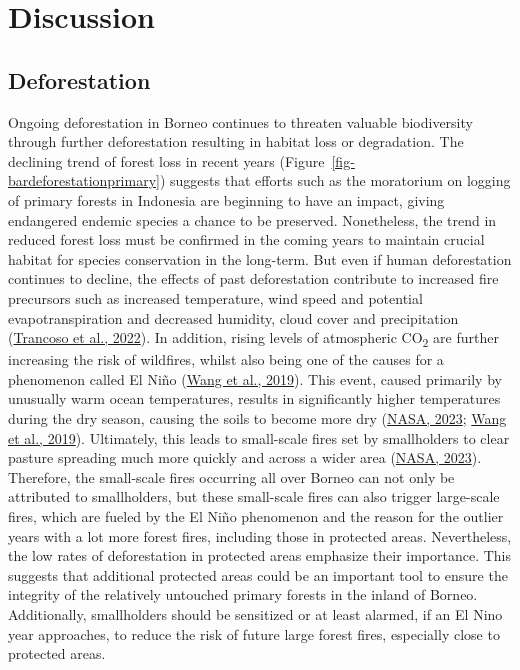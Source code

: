 \documentclass[
  letterpaper,
  DIV=11,
  numbers=noendperiod]{scrreprt}
\begin{document}

\hypertarget{sec-discussion}{%
\chapter{Discussion}\label{sec-discussion}}

\hypertarget{sec-d_deforestation}{%
\section{Deforestation}\label{sec-d_deforestation}}

Ongoing deforestation in Borneo continues to threaten valuable
biodiversity through further deforestation resulting in habitat loss or
degradation. The declining trend of forest loss in recent years
(Figure~\ref{fig-bardeforestationprimary}) suggests that efforts such as
the moratorium on logging of primary forests in Indonesia are beginning
to have an impact, giving endangered endemic species a chance to be
preserved. Nonetheless, the trend in reduced forest loss must be
confirmed in the coming years to maintain crucial habitat for species
conservation in the long-term. But even if human deforestation continues
to decline, the effects of past deforestation contribute to increased
fire precursors such as increased temperature, wind speed and potential
evapotranspiration and decreased humidity, cloud cover and precipitation
(\protect\hyperlink{ref-trancosoConvertingTropicalForests2022}{Trancoso
et al., 2022}). In addition, rising levels of atmospheric
CO\textsubscript{2} are further increasing the risk of wildfires, whilst
also being one of the causes for a phenomenon called El Niño
(\protect\hyperlink{ref-wangHistoricalChangeNino2019}{Wang et al.,
2019}). This event, caused primarily by unusually warm ocean
temperatures, results in significantly higher temperatures during the
dry season, causing the soils to become more dry
(\protect\hyperlink{ref-nasaIndonesianFiresReturn2023}{NASA, 2023};
\protect\hyperlink{ref-wangHistoricalChangeNino2019}{Wang et al.,
2019}). Ultimately, this leads to small-scale fires set by smallholders
to clear pasture spreading much more quickly and across a wider area
(\protect\hyperlink{ref-nasaIndonesianFiresReturn2023}{NASA, 2023}).
Therefore, the small-scale fires occurring all over Borneo can not only
be attributed to smallholders, but these small-scale fires can also
trigger large-scale fires, which are fueled by the El Niño phenomenon
and the reason for the outlier years with a lot more forest fires,
including those in protected areas. Nevertheless, the low rates of
deforestation in protected areas emphasize their importance. This
suggests that additional protected areas could be an important tool to
ensure the integrity of the relatively untouched primary forests in the
inland of Borneo. Additionally, smallholders should be sensitized or at
least alarmed, if an El Nino year approaches, to reduce the risk of
future large forest fires, especially close to protected areas.
\end{document}
